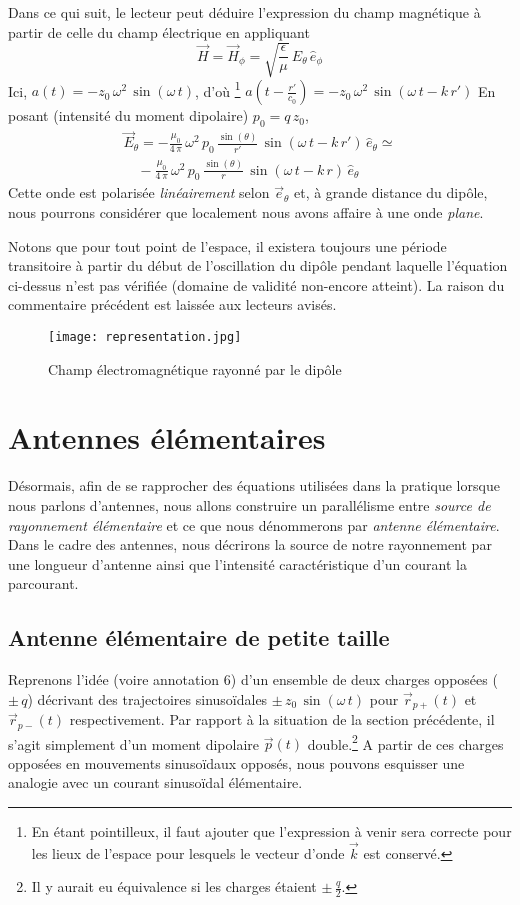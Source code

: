 Dans ce qui suit, le lecteur peut déduire l'expression du champ magnétique à partir de celle du champ électrique en appliquant $$\vec{H} = \vec{H}_{\phi} = \sqrt{\frac{\epsilon}{\mu}} \, E_{\theta} \, \hat{e}_{\phi}$$
Ici, $a(t) = -z_{0}\,\omega^2\,\sin(\omega\,t)$, d'où \footnote{En étant pointilleux, il faut ajouter que l'expression à venir sera correcte pour les lieux de l'espace pour lesquels le vecteur d'onde $\vec{k}$ est conservé.}  $ a(t-\frac{r'}{c_0}) = -z_0\,\omega^2\,\sin(\omega\,t - k\,r') $
En posant (intensité du moment dipolaire) $p_0 = q\,z_0$, \begin{multline*} \vec{E}_{\theta} = -\frac{\mu_0}{4\,\pi}\,\omega^2\,p_0\,\frac{\sin(\theta)}{r'}\,\sin(\omega\,t - k\,r')\,\hat{e}_{\theta}\simeq \\ \quad -\frac{\mu_0}{4\,\pi}\,\omega^2\,p_0\,\frac{\sin(\theta)}{r}\,\sin(\omega\,t - k\,r)\,\hat{e}_{\theta}\end{multline*}
Cette onde est polarisée \textit{linéairement} selon $\vec{e}_{\theta}$ et, à grande distance du dipôle, nous pourrons considérer que localement nous avons affaire à une onde \textit{plane}.

Notons que pour tout point de l'espace, il existera toujours une période transitoire à partir du début de l'oscillation du dipôle pendant laquelle l'équation ci-dessus n'est pas vérifiée (domaine de validité non-encore atteint). La raison du commentaire précédent est laissée aux lecteurs avisés. 

\begin{figure}[h]\centering
\texttt{[image: representation.jpg]}
\caption{Champ électromagnétique rayonné par le dipôle}
\label{fig:dipo2}
\end{figure}


\section{Antennes élémentaires}

Désormais, afin de se rapprocher des équations utilisées dans la pratique lorsque nous parlons d'antennes, nous allons construire un parallélisme entre \textit{source de rayonnement élémentaire} et ce que nous dénommerons par \textit{antenne élémentaire}. Dans le cadre des antennes, nous décrirons la source de notre rayonnement par une longueur d'antenne ainsi que l'intensité caractéristique d'un courant la parcourant.
\subsection{Antenne élémentaire de petite taille}
Reprenons l'idée (voire annotation 6) d'un ensemble de deux charges opposées ($\pm\,q$) décrivant des trajectoires sinusoïdales $\pm\,z_0\,\sin(\omega\,t)$ pour $\vec{r}_{p+}(t)$ et $\vec{r}_{p-}(t)$ respectivement. Par rapport à la situation de la section précédente, il s'agit simplement d'un moment dipolaire $\vec{p}(t)$ double.\footnote{Il y aurait eu équivalence si les charges étaient $\pm\,\frac{q}{2}$.} A partir de ces charges opposées en mouvements sinusoïdaux opposés, nous pouvons esquisser une analogie avec un courant sinusoïdal élémentaire. 

